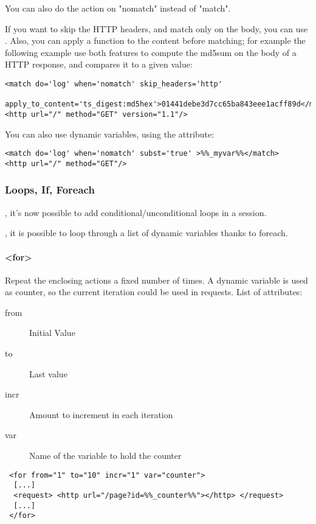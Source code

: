 \documentclass{TSUNG-en}
\begin{document}
You can also do the action on "nomatch" instead of "match".


If you want to skip the HTTP headers, and match only on the body, you
can use . Also, you can apply a
function to the content before matching; for example the following
example use both features to compute the md5sum on the body of a HTTP
response, and compares it to a given value:
\begin{Verbatim}
<match do='log' when='nomatch' skip_headers='http'
  apply_to_content='ts_digest:md5hex'>01441debe3d7cc65ba843eee1acff89d</match>
<http url="/" method="GET" version="1.1"/>
\end{Verbatim}

You can also use dynamic variables, using the  attribute:
\begin{Verbatim}
<match do='log' when='nomatch' subst='true' >%%_myvar%%</match>
<http url="/" method="GET"/>
\end{Verbatim}

\subsubsection{Loops, If, Foreach}

, it's now possible to add conditional/unconditional loops in a session.

, it is possible to loop through a list of dynamic variables thanks to foreach.

\paragraph{<for>}


Repeat the enclosing actions a fixed number of times. A dynamic
variable is used as counter, so the current iteration could be used in
requests. List of attributes:

\begin{description}
\item[from] Initial Value
\item[to]   Last value
\item[incr] Amount to increment in each iteration
\item[var]  Name of the variable to hold the counter
\end{description}

\begin{Verbatim}
 <for from="1" to="10" incr="1" var="counter">
  [...]
  <request> <http url="/page?id=%%_counter%%"></http> </request>
  [...]
 </for>
\end{Verbatim}
\end{document}
